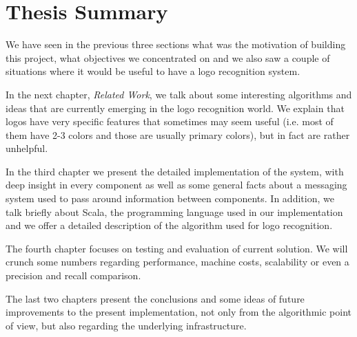 \section{Thesis Summary}

We have seen in the previous three sections what was the motivation of
building this project, what objectives we concentrated on and we also saw
a couple of situations where it would be useful to have a logo recognition
system.

In the next chapter, \textit{Related Work}, we talk about some
interesting algorithms and ideas that are currently emerging in the logo
recognition world. We explain that logos have very specific features that
sometimes may seem useful (i.e. most of them have 2-3 colors and those are
usually primary colors), but in fact are rather unhelpful.

In the third chapter we present the detailed implementation of the system,
with deep insight in every component as well as some general facts about a
messaging system used to pass around information between components. In
addition, we talk briefly about Scala, the programming language used in our
implementation and we offer a detailed description of the algorithm used
for logo recognition.

The fourth chapter focuses on testing and evaluation of current solution. We
will crunch some numbers regarding performance, machine costs, scalability or
even a precision and recall comparison.

The last two chapters present the conclusions and some ideas of future improvements to the present
implementation, not only from the algorithmic point of view, but also
regarding the underlying infrastructure.

